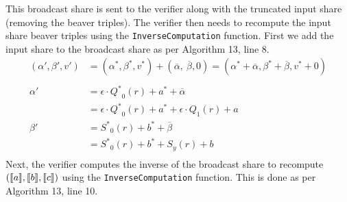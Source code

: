 \documentclass[11pt]{report}
\theoremstyle{definition}
\theoremstyle{plain}
\begin{document}
This broadcast share is sent to the verifier along with the truncated input share (removing the beaver triples). The verifier then needs to recompute the input share beaver triples using the \texttt{InverseComputation} function. First we add the input share to the broadcast share as per Algorithm 13, line 8.
\begin{align*}
  (\alpha', \beta', v') & = (\alpha^*, \beta^*, v^*) + (\overline{\alpha},\ \overline{\beta}, 0)
  = (\alpha^* + \overline{\alpha}, \beta^* + \overline{\beta}, v^* + 0)                          \\\\
  \alpha'               & = \epsilon \cdot {Q^*}_0(r) + a^* + \overline{\alpha}                  \\
                        & = \epsilon \cdot {Q^*}_0(r) + a^* + \epsilon \cdot Q_1(r) + a          \\
  \beta'                & = {S^*}_0(r) + b^* + \overline{\beta}                                  \\
                        & = {S^*}_0(r) + b^* + S_y(r) + b                                        \\
\end{align*}
Next, the verifier computes the inverse of the broadcast share to recompute $(\llbracket a \rrbracket, \llbracket b \rrbracket, \llbracket c \rrbracket)$ using the \texttt{InverseComputation} function. This is done as per Algorithm 13, line 10.
\end{document}
